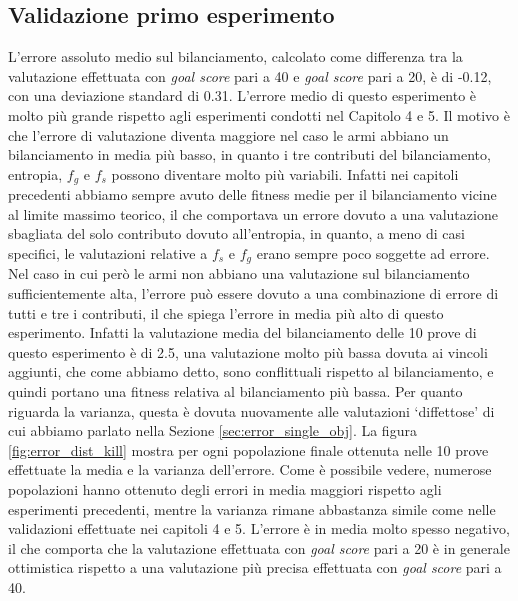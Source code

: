 \documentclass[12pt, italian]{toptesi}
\begin{document}
\subsection{Validazione primo esperimento}
\label{sec:val_primo}

L'errore assoluto medio sul bilanciamento, calcolato come differenza tra la valutazione effettuata con \emph{goal score} pari a 40 e \emph{goal score} pari a 20, è di -0.12, con una deviazione standard di 0.31.
L'errore medio di questo esperimento è molto più grande rispetto agli esperimenti condotti nel Capitolo 4 e 5. 
Il motivo è che l'errore di valutazione diventa maggiore nel caso le armi abbiano un bilanciamento in media più basso, in quanto i tre contributi del bilanciamento, entropia, $f_g$ e $f_s$ possono diventare molto più variabili.
Infatti nei capitoli precedenti abbiamo sempre avuto delle fitness medie per il bilanciamento vicine al limite massimo teorico, il che comportava un errore dovuto a una valutazione sbagliata del solo contributo dovuto all'entropia, in quanto, a meno di casi specifici, le valutazioni relative a $f_s$ e $f_g$ erano sempre poco soggette ad errore.
Nel caso in cui però le armi non abbiano una valutazione sul bilanciamento sufficientemente alta, l'errore può essere dovuto a una combinazione di errore di tutti e tre i contributi, il che spiega l'errore in media più alto di questo esperimento.
Infatti la valutazione media del bilanciamento delle 10 prove di questo esperimento è di 2.5, una valutazione molto più bassa dovuta ai vincoli aggiunti, che come abbiamo detto, sono conflittuali rispetto al bilanciamento, e quindi portano una fitness relativa al bilanciamento più bassa.
Per quanto riguarda la varianza, questa è dovuta nuovamente alle valutazioni `diffettose' di cui abbiamo parlato nella Sezione \ref{sec:error_single_obj}.
La figura \ref{fig:error_dist_kill} mostra per ogni popolazione finale ottenuta nelle 10 prove effettuate la media e la varianza dell'errore. Come è possibile vedere, numerose popolazioni hanno ottenuto degli errori in media maggiori rispetto agli esperimenti precedenti, mentre la varianza rimane abbastanza simile come nelle validazioni effettuate nei capitoli 4 e 5. 
L'errore è in media molto spesso negativo, il che comporta che la valutazione effettuata con \emph{goal score} pari a 20 è in generale ottimistica rispetto a una valutazione più precisa effettuata con \emph{goal score} pari a 40.
\end{document}

